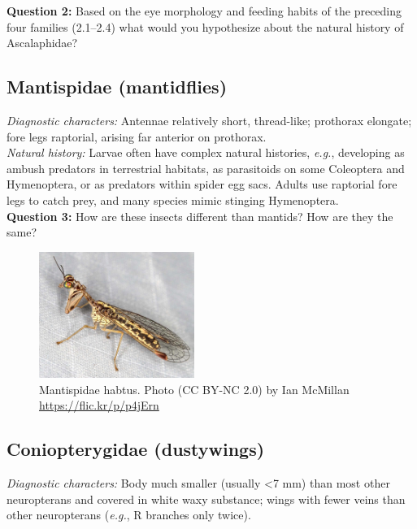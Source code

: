 \documentclass[letterpaper, 11pt]{article}
\begin{document}
\noindent{}\textbf{Question 2:} Based on the eye morphology and feeding habits of the preceding four families (2.1--2.4) what would you hypothesize about the natural history of Ascalaphidae?

\subsection{Mantispidae (mantidflies)}
\noindent{}\textit{Diagnostic characters:} Antennae relatively short, thread-like; prothorax elongate; fore legs raptorial, arising far anterior on prothorax.\\

\noindent{}\textit{Natural history:} Larvae often have complex natural histories, \textit{e.g.}, developing as ambush predators in terrestrial habitats, as parasitoids on some Coleoptera and Hymenoptera, or as predators within spider egg sacs. Adults use raptorial fore legs to catch prey, and many species mimic stinging Hymenoptera.\\

\noindent{}\textbf{Question 3:} How are these insects different than mantids? How are they the same?

\begin{figure}[ht!]
  \centering
    \includegraphics[width=0.45\textwidth]{MantispidHabitus}
  \caption{Mantispidae habtus. Photo (CC BY-NC 2.0) by Ian McMillan \url{https://flic.kr/p/p4jErn}}
  \label{fig:mantispid}
\end{figure}

\subsection{Coniopterygidae (dustywings)}
\noindent{}\textit{Diagnostic characters:} Body much smaller (usually \textless7 mm) than most other neuropterans and covered in white waxy substance; wings with fewer veins than other neuropterans (\textit{e.g.}, R branches only twice).\\
\end{document}
